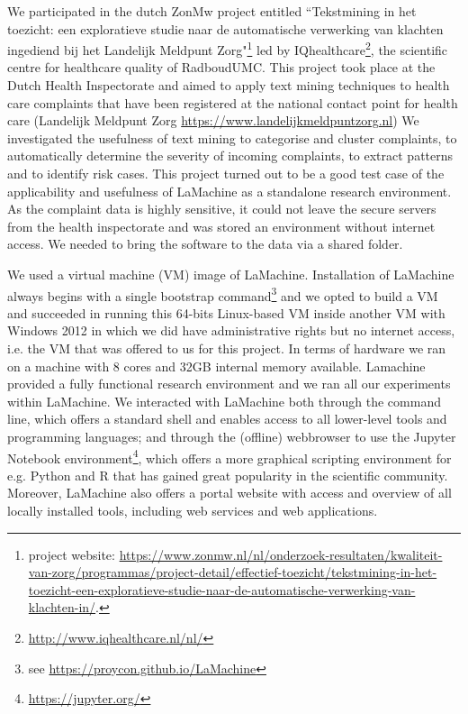 \documentclass[a4paper,11pt]{article}
\begin{document}
We participated in the dutch ZonMw project entitled ``Tekstmining in het toezicht: een exploratieve studie naar de
automatische verwerking van klachten ingediend bij het Landelijk Meldpunt Zorg"\footnote{project website:
\url{https://www.zonmw.nl/nl/onderzoek-resultaten/kwaliteit-van-zorg/programmas/project-detail/effectief-toezicht/tekstmining-in-het-toezicht-een-exploratieve-studie-naar-de-automatische-verwerking-van-klachten-in/}.
} led by IQhealthcare\footnote{\url{http://www.iqhealthcare.nl/nl/}}, the scientific centre for healthcare quality of RadboudUMC.
This project took place at the Dutch Health Inspectorate and aimed to apply text mining techniques to health care complaints that have been registered at the national contact point for health care (Landelijk Meldpunt Zorg \url{https://www.landelijkmeldpuntzorg.nl})
We investigated the usefulness of text mining to categorise and cluster complaints, to automatically determine the
severity of incoming complaints, to extract patterns  and to identify risk cases. This project turned out to be a good
test case of the applicability and usefulness of LaMachine as a standalone research environment.
As the complaint data is highly sensitive, it could not leave the secure servers from the health inspectorate and was
stored an environment without internet access. We needed to bring the software to the data via a shared folder.

We used a virtual machine (VM) image of LaMachine. Installation of LaMachine always begins with a single bootstrap
command\footnote{see
\url{https://proycon.github.io/LaMachine}} and we opted to build a VM and succeeded in running this 64-bits Linux-based VM inside another
VM with Windows 2012 in which we did have administrative rights but no internet access, i.e. the VM that was offered to
us for this project. In terms of hardware we ran on a
machine with 8 cores and  32GB internal memory available.
Lamachine provided a fully functional research environment and we ran all our experiments within LaMachine. We interacted with LaMachine both through the command line, which offers a standard
shell and enables access to all lower-level tools and programming languages; and through the (offline) webbrowser to use the Jupyter Notebook environment\footnote{\url{https://jupyter.org/}}, which offers a more graphical scripting environment
for e.g. Python and R that has gained great popularity in the scientific community. Moreover, LaMachine also offers a portal
website with access and overview of all locally installed tools, including web services and web applications.
\end{document}
